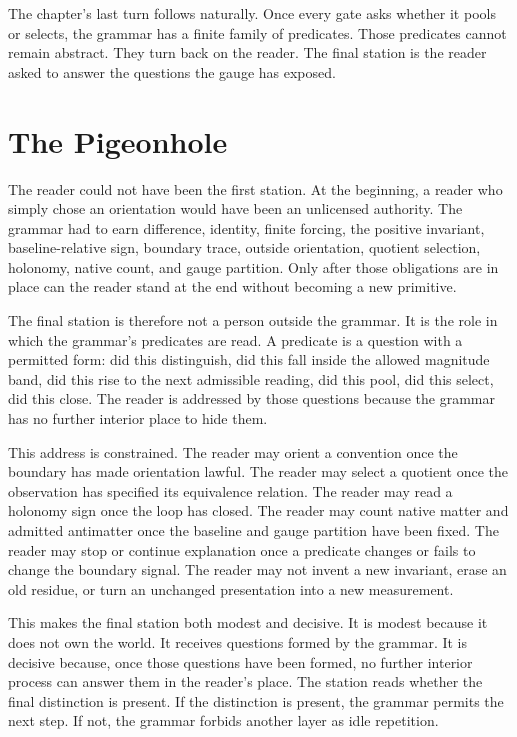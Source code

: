 The chapter's last turn follows naturally. Once every gate asks whether it
pools or selects, the grammar has a finite family of predicates. Those
predicates cannot remain abstract. They turn back on the reader. The final
station is the reader asked to answer the questions the gauge has exposed.

\section{The Pigeonhole}

The reader could not have been the first station. At the beginning, a reader
who simply chose an orientation would have been an unlicensed authority. The
grammar had to earn difference, identity, finite forcing, the positive
invariant, baseline-relative sign, boundary trace, outside orientation,
quotient selection, holonomy, native count, and gauge partition. Only after
those obligations are in place can the reader stand at the end without
becoming a new primitive.

The final station is therefore not a person outside the grammar. It is the
role in which the grammar's predicates are read. A predicate is a question
with a permitted form: did this distinguish, did this fall inside the
allowed magnitude band, did this rise to the next admissible reading, did
this pool, did this select, did this close. The reader is addressed by those
questions because the grammar has no further interior place to hide them.

This address is constrained. The reader may orient a convention once the
boundary has made orientation lawful. The reader may select a quotient once
the observation has specified its equivalence relation. The reader may read a
holonomy sign once the loop has closed. The reader may count native matter
and admitted antimatter once the baseline and gauge partition have been
fixed. The reader may stop or continue explanation once a predicate changes
or fails to change the boundary signal. The reader may not invent a new
invariant, erase an old residue, or turn an unchanged presentation into a
new measurement.

This makes the final station both modest and decisive. It is modest because
it does not own the world. It receives questions formed by the grammar. It
is decisive because, once those questions have been formed, no further
interior process can answer them in the reader's place. The station reads
whether the final distinction is present. If the distinction is present, the
grammar permits the next step. If not, the grammar forbids another layer as
idle repetition.

